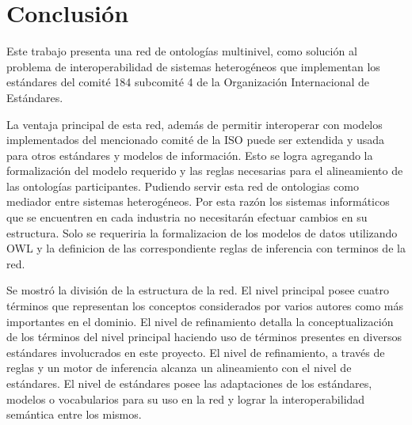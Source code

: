 \documentclass[journal]{IEEEtran}
\begin{document}




\section{Conclusi\'on}

Este trabajo presenta una red de ontolog\'ias multinivel, como soluci\'on al problema de interoperabilidad de sistemas heterog\'eneos que implementan los est\'andares del comit\'e 184 subcomit\'e 4 de la Organizaci\'on Internacional de Est\'andares. 

La ventaja principal de esta red, adem\'as de permitir interoperar con modelos implementados del mencionado comit\'e de la ISO puede ser extendida y usada para otros est\'andares y modelos de informaci\'on. Esto se logra agregando la formalizaci\'on del modelo requerido y las reglas necesarias para el alineamiento de las ontolog\'ias participantes. Pudiendo servir esta red de ontologias como mediador entre sistemas heterog\'eneos. Por esta raz\'on los sistemas inform\'aticos que se encuentren en cada industria no necesitar\'an efectuar cambios en su estructura. Solo se requeriria la formalizacion de los modelos de datos utilizando OWL y la definicion de las correspondiente reglas de inferencia con terminos de la red.

Se mostr\'o la divisi\'on de la estructura de la red. El nivel principal posee cuatro t\'erminos que representan los conceptos considerados por varios autores como m\'as importantes en el dominio. El nivel de refinamiento detalla la conceptualizaci\'on de los t\'erminos del nivel principal haciendo uso de t\'erminos presentes en diversos est\'andares involucrados en este proyecto. El nivel de refinamiento, a trav\'es de reglas y un motor de inferencia alcanza un alineamiento con el nivel de est\'andares. El nivel de est\'andares posee las adaptaciones de los est\'andares, modelos o vocabularios para su uso en la red y lograr la interoperabilidad sem\'antica entre los mismos. 
\end{document}
